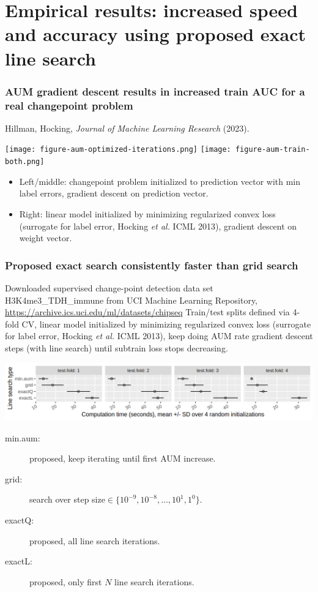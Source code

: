\documentclass[t]{beamer}
\begin{document}
\section{Empirical results: increased speed and accuracy using proposed exact line search}

\begin{frame}
  \frametitle{AUM gradient descent results in increased train AUC for
    a real changepoint problem}

Hillman, Hocking, \emph{Journal of Machine Learning Research} (2023).

\texttt{[image: figure-aum-optimized-iterations.png]}
\texttt{[image: figure-aum-train-both.png]}

\begin{itemize}
\item Left/middle: changepoint problem initialized to prediction vector with
  min label errors, gradient descent on prediction vector.
\item Right: linear model initialized by minimizing regularized convex
  loss (surrogate for label error, Hocking \emph{et al.} ICML 2013),
  gradient descent on weight vector.
\end{itemize}

\end{frame}

\begin{frame}
  \frametitle{Proposed exact search consistently faster than grid search}

  Downloaded supervised change-point detection data set
  H3K4me3\_TDH\_immune from UCI Machine Learning Repository,
  \url{https://archive.ics.uci.edu/ml/datasets/chipseq}
  Train/test splits defined via 4-fold CV, linear model initialized by
  minimizing regularized convex loss (surrogate for label error,
  Hocking \emph{et al.} ICML 2013), keep doing AUM rate gradient
  descent steps (with line search) until subtrain loss stops decreasing.

  \includegraphics[width=\textwidth]{figure-line-search-complexity-compare-H3K4me3_TDH_immune-equal_labels-rate-IntervalRegressionCV-seconds}

  \begin{description}
  \item[min.aum:] proposed, keep iterating until first AUM
    increase.
  \item[grid:] search over step
    size$\in\{10^{-9},10^{-8},\dots,10^1,1^0\}$.
  \item[exactQ:] proposed, all line search iterations.
  \item[exactL:] proposed, only first $N$ line search iterations.
  \end{description}
\end{frame}
\end{document}
